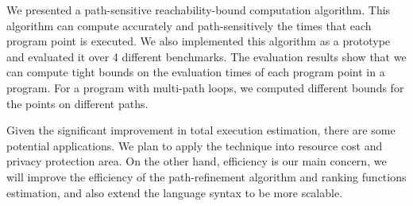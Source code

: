 We presented a path-sensitive reachability-bound computation algorithm.
This algorithm can compute accurately and path-sensitively the times that each program point is executed.
We also implemented this algorithm as a prototype and evaluated it over 4 different benchmarks.
The evaluation results show that we can compute tight bounds on the evaluation times of each program point in a program. For a program with multi-path loops, we computed different bounds for the points on different paths.

Given the significant improvement in total execution estimation, there are some potential applications.
We plan to apply the technique into resource cost and privacy protection area.
On the other hand, efficiency is our main concern, we will improve the efficiency of the path-refinement algorithm and ranking functions estimation, and also extend the language syntax
to be more scalable.